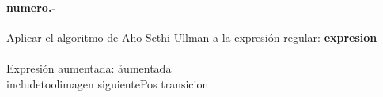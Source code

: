 

\paragraph{{numero}.-}\label{p{numero}}
Aplicar el algoritmo de Aho-Sethi-Ullman a la expresión regular: \textbf{{expresion}} \\
\\
Expresión aumentada: \h{{aumentada}} \\

{includetool}{{imagen}}
{siguientePos}
\quad
{transicion}